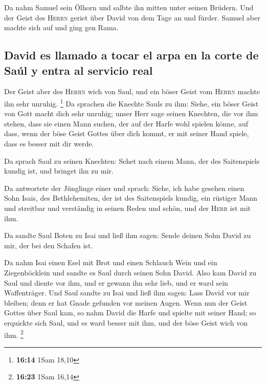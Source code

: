  Da nahm Samuel sein Ölhorn und salbte ihn mitten unter
seinen Brüdern. Und der Geist des \textsc{Herrn} geriet über David von
dem Tage an und fürder. Samuel aber machte sich auf und ging gen Rama.

\hypertarget{david-es-llamado-a-tocar-el-arpa-en-la-corte-de-sauxfal-y-entra-al-servicio-real}{%
\subsection{David es llamado a tocar el arpa en la corte de Saúl y entra
al servicio
real}\label{david-es-llamado-a-tocar-el-arpa-en-la-corte-de-sauxfal-y-entra-al-servicio-real}}

 Der Geist aber des \textsc{Herrn} wich von Saul, und ein
böser Geist vom \textsc{Herrn} machte ihn sehr unruhig. \footnote{\textbf{16:14}
  1Sam 18,10}  Da sprachen die Knechte Sauls zu ihm:
Siehe, ein böser Geist von Gott macht dich sehr unruhig; 
unser Herr sage seinen Knechten, die vor ihm stehen, dass sie einen Mann
suchen, der auf der Harfe wohl spielen könne, auf dass, wenn der böse
Geist Gottes über dich kommt, er mit seiner Hand spiele, dass es besser
mit dir werde.

 Da sprach Saul zu seinen Knechten: Sehet nach einem
Mann, der des Saitenspiels kundig ist, und bringet ihn zu mir.

 Da antwortete der Jünglinge einer und sprach: Siehe, ich
habe gesehen einen Sohn Isais, des Bethlehemiten, der ist des
Saitenspiels kundig, ein rüstiger Mann und streitbar und verständig in
seinen Reden und schön, und der \textsc{Herr} ist mit ihm.

 Da sandte Saul Boten zu Isai und ließ ihm sagen: Sende
deinen Sohn David zu mir, der bei den Schafen ist.

 Da nahm Isai einen Esel mit Brot und einen Schlauch Wein
und ein Ziegenböcklein und sandte es Saul durch seinen Sohn David.
 Also kam David zu Saul und diente vor ihm, und er gewann
ihn sehr lieb, und er ward sein Waffenträger.  Und Saul
sandte zu Isai und ließ ihm sagen: Lass David vor mir bleiben; denn er
hat Gnade gefunden vor meinen Augen.  Wenn nun der Geist
Gottes über Saul kam, so nahm David die Harfe und spielte mit seiner
Hand; so erquickte sich Saul, und es ward besser mit ihm, und der böse
Geist wich von ihm. \footnote{\textbf{16:23} 1Sam 16,14}

